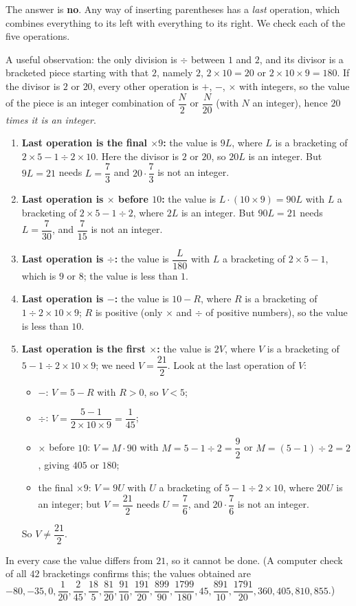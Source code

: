 The answer is \textbf{no}. Any way of inserting parentheses has a \emph{last} operation, which combines everything to its left with everything to its right. We check each of the five operations.

A useful observation: the only division is $\div$ between $1$ and $2$, and its divisor is a bracketed piece starting with that $2$, namely $2$, $2\times10=20$ or $2\times10\times9=180$. If the divisor is $2$ or $20$, every other operation is $+$, $-$, $\times$ with integers, so the value of the piece is an integer combination of $\dfrac{N}{2}$ or $\dfrac{N}{20}$ (with $N$ an integer), hence \emph{$20$ times it is an integer}.

\begin{enumerate}
\item \textbf{Last operation is the final $\times9$:} the value is $9L$, where $L$ is a bracketing of $2\times5-1\div2\times10$. Here the divisor is $2$ or $20$, so $20L$ is an integer. But $9L=21$ needs $L=\dfrac{7}{3}$ and $20\cdot\dfrac{7}{3}$ is not an integer.
\item \textbf{Last operation is $\times$ before $10$:} the value is $L\cdot(10\times9)=90L$ with $L$ a bracketing of $2\times5-1\div2$, where $2L$ is an integer. But $90L=21$ needs $L=\dfrac{7}{30}$, and $\dfrac{7}{15}$ is not an integer.
\item \textbf{Last operation is $\div$:} the value is $\dfrac{L}{180}$ with $L$ a bracketing of $2\times5-1$, which is $9$ or $8$; the value is less than $1$.
\item \textbf{Last operation is $-$:} the value is $10-R$, where $R$ is a bracketing of $1\div2\times10\times9$; $R$ is positive (only $\times$ and $\div$ of positive numbers), so the value is less than $10$.
\item \textbf{Last operation is the first $\times$:} the value is $2V$, where $V$ is a bracketing of $5-1\div2\times10\times9$; we need $V=\dfrac{21}{2}$. Look at the last operation of $V$:
\begin{itemize}
\item $-$: $V=5-R$ with $R>0$, so $V<5$;
\item $\div$: $V=\dfrac{5-1}{2\times10\times9}=\dfrac{1}{45}$;
\item $\times$ before $10$: $V=M\cdot90$ with $M=5-1\div2=\dfrac{9}{2}$ or $M=(5-1)\div2=2$, giving $405$ or $180$;
\item the final $\times9$: $V=9U$ with $U$ a bracketing of $5-1\div2\times10$, where $20U$ is an integer; but $V=\dfrac{21}{2}$ needs $U=\dfrac{7}{6}$, and $20\cdot\dfrac{7}{6}$ is not an integer.
\end{itemize}
So $V\ne\dfrac{21}{2}$.
\end{enumerate}
In every case the value differs from $21$, so it $\boxed{\text{cannot be done}}$. (A computer check of all $42$ bracketings confirms this; the values obtained are $-80,-35,0,\dfrac{1}{20},\dfrac{2}{45},\dfrac{18}{5},\dfrac{81}{20},\dfrac{91}{10},\dfrac{191}{20},\dfrac{899}{90},\dfrac{1799}{180},45,\dfrac{891}{10},\dfrac{1791}{20},360,405,810,855$.)
